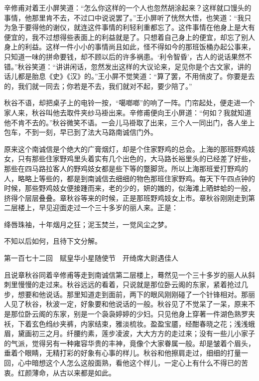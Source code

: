 \documentclass[12pt,UTF8]{ctexbook}
\begin{document}
{{{辛修甫对着王小屏笑道：“怎么你这样的一个人也忽然胡涂起来？这样就口馒头的事情，他那里肯不去，不过口中说说罢了。”王小屏听了恍然大悟，也笑道：“我只为急于要得他的谢仪，就连这件事情的利轻利重都忘了。这件事情在他身上是大有便宜的，我不过想得些表面上的利益就是了。只想着自己身上的便宜，却忘了别人身上的利益。这样一件小小的事情尚且如此，怪不得如今的那班饭桶办起公事来，只知道一味的拼命要钱，却不顾以后的许多祸患。‘利令智昏’，古人的说话果然不错。”秋谷笑道：“讲讲闲话，忽然发出这样的大议论来，足见你是个古文家，讲的话儿都是胎息《史》《汉》的。”王小屏不觉笑道：“算了罢，不用俏皮了。你要是去的，我们就一同去；你若是不去，我们就对不起，要少陪了。”

秋谷不语，却把桌子上的电铃一按，“噶啷啷”的响了一阵。门帘起处，便走进一个家人来，秋谷叫他去取件夹纱马褂出来。辛修甫便向王小屏道：“何如？我就知道他不肯不去的。”秋谷微笑不语。一会儿马褂取了出来，三个人一同出门，各人坐上包车，不到一刻，早已到了法大马路南诚信门外。

原来这个南诚信是个绝大的广膏烟灯，却是个住家野鸡的总会。上海的那班野鸡妓女，只有那些住家野鸡里头着实有几个出色的，大马路长裕里头的已经差了好些，那些在四马路拉客人的野鸡妓女都是些下等的蹩脚货。所以上海那班爱打野鸡的人，略略上等些的，都是到南诚信去细细的物色那班住家野鸡。每天下午四点钟的时候，那些野鸡妓女便接踵而来，老的少的，妍的媸的，似海滩上晒蚌蛤的一般，挤得个层层叠叠。章秋谷等来的时候，正是那班野鸡妓女上市。章秋谷刚刚走到第二层楼上，早见迎面走过一个三十多岁的丽人来。正是：

绛唇珠袖，十年烟月之狂；泥玉焚兰，一觉风尘之梦。

不知以后如何，且待下文分解。





第一百七十二回　赋皇华小星随使节　开绮席大尉遇佳人





且说章秋谷同着辛修甫等走到南诚信第二层楼上，蓦然见一个三十多岁的丽人从斜刺里慢慢的走过来。秋谷远远的看着，只说就是那位卧云阁的东家，紧着抢过几步，想要和他说话。那里知道走到面前，两下的眼风刚刚碰了一个针锋相对。那丽人见了秋谷，秋波一定，好象要和他说话的一般。秋谷见了不觉呆了一呆，原来不是那位卧云阁的东家，别是一个袅袅婷婷的少妇。只见他身上穿著一件湖色熟罗夹袄，下着玄色绉纱夹裤，内家结束，雅淡梳妆。盈盈宝靥，经酣春晓之花；浅浅蛾眉，黛画初三之月。纤腰约素，莲步凌波，大大方方的走过来；没有一些儿小家子的气派，觉得另有一种雍容华贵的丰神，竟像个大家眷属一般。却是皱着个眉头，垂着个眼睛，无精打彩的好象有心事的样儿。秋谷和他擦肩走过，细细的打量一回，心中暗想这个人怎么这般面熟，看他这个样儿，一定心上有什么不得已的苦衷。红颜薄命，从古以来都是如此。

}}}
\end{document}
